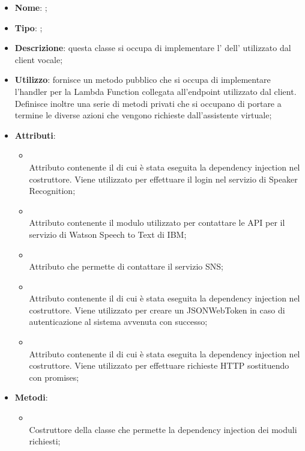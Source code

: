 \begin{itemize}
	\item \textbf{Nome}: ;
	\item \textbf{Tipo}: ;
	\item \textbf{Descrizione}: questa classe si occupa di implementare l' dell' utilizzato dal client vocale;
	\item \textbf{Utilizzo}: fornisce un metodo pubblico che si occupa di implementare l'handler per la Lambda Function collegata all'endpoint utilizzato dal client. Definisce inoltre una serie di metodi privati che si occupano di portare a termine le diverse azioni che vengono richieste dall'assistente virtuale;
	\item \textbf{Attributi}:
	\begin{itemize}
		\item[]  \\
		Attributo contenente il  di cui è stata eseguita la dependency injection nel costruttore. Viene utilizzato per effettuare il login nel servizio di Speaker Recognition;
		\item[]  \\
		Attributo contenente il modulo utilizzato per contattare le API per il servizio di Watson Speech to Text di IBM;
		\item[]  \\
		Attributo che permette di contattare il servizio SNS;
		\item[]  \\
		Attributo contenente il  di cui è stata eseguita la dependency injection nel costruttore. Viene utilizzato per creare un JSONWebToken in caso di autenticazione al sistema avvenuta con successo;
		\item[]  \\
		Attributo contenente il  di cui è stata eseguita la dependency injection nel costruttore. Viene utilizzato per effettuare richieste HTTP sostituendo  con promises;
	\end{itemize}
	\item \textbf{Metodi}:
	\begin{itemize}
		\item[]  \\		Costruttore della classe  che permette la dependency injection dei moduli richiesti;\\

\end{itemize}
\end{itemize}

